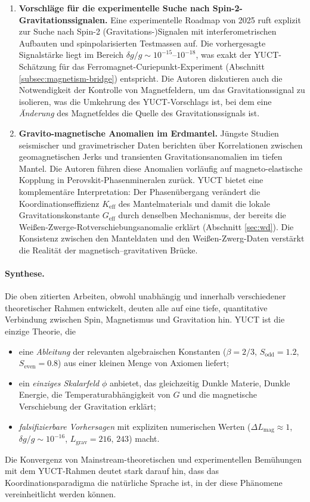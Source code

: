 \documentclass[12pt]{article}
\theoremstyle{remark}
\begin{document}
\begin{enumerate}
		\item \textbf{Vorschläge für die experimentelle Suche nach Spin-2-Gravitationssignalen.}
		Eine experimentelle Roadmap von 2025 \cite{Spin2Proposal2025} ruft explizit zur Suche
		nach Spin-2 (Gravitations-)Signalen mit interferometrischen Aufbauten und spinpolarisierten
		Testmassen auf.  Die vorhergesagte Signalstärke liegt im Bereich $\delta g / g \sim 10^{-15}$–$10^{-18}$,
		was exakt der YUCT-Schätzung für das Ferromagnet-Curiepunkt-Experiment (Abschnitt \ref{subsec:magnetism-bridge}) entspricht.
		Die Autoren diskutieren auch die Notwendigkeit der Kontrolle von Magnetfeldern, um das
		Gravitationssignal zu isolieren, was die Umkehrung des YUCT-Vorschlags ist, bei dem eine
		\emph{Änderung} des Magnetfeldes die Quelle des Gravitationssignals ist.
		
		\item \textbf{Gravito-magnetische Anomalien im Erdmantel.}
		Jüngste Studien seismischer und gravimetrischer Daten \cite{MantleGM2025} berichten über
		Korrelationen zwischen geomagnetischen Jerks und transienten Gravitationsanomalien im
		tiefen Mantel.  Die Autoren führen diese Anomalien vorläufig auf magneto-elastische Kopplung
		in Perovskit-Phasenmineralen zurück.  YUCT bietet eine komplementäre Interpretation:
		Der Phasenübergang verändert die Koordinationseffizienz $K_{\mathrm{eff}}$ des Mantelmaterials
		und damit die lokale Gravitationskonstante $G_{\mathrm{eff}}$ durch denselben Mechanismus,
		der bereits die Weißen-Zwerge-Rotverschiebungsanomalie erklärt (Abschnitt \ref{sec:wd}).
		Die Konsistenz zwischen den Manteldaten und den Weißen-Zwerg-Daten verstärkt die Realität
		der magnetisch–gravitativen Brücke.
		
	\end{enumerate}
	
	\paragraph{Synthese.}
	Die oben zitierten Arbeiten, obwohl unabhängig und innerhalb verschiedener theoretischer Rahmen
	entwickelt, deuten alle auf eine tiefe, quantitative Verbindung zwischen Spin, Magnetismus
	und Gravitation hin.  YUCT ist die einzige Theorie, die
	\begin{itemize}
		\item eine \emph{Ableitung} der relevanten algebraischen Konstanten
		($\beta = 2/3$, $S_{\mathrm{odd}} = 1.2$, $S_{\mathrm{even}} = 0.8$)
		aus einer kleinen Menge von Axiomen liefert;
		\item ein \emph{einziges Skalarfeld} $\phi$ anbietet, das gleichzeitig
		Dunkle Materie, Dunkle Energie, die Temperaturabhängigkeit von $G$ und
		die magnetische Verschiebung der Gravitation erklärt;
		\item \emph{falsifizierbare Vorhersagen} mit expliziten numerischen
		Werten ($\Delta L_{\mathrm{mag}} \approx 1$, $\delta g/g \sim 10^{-16}$,
		$L_{\mathrm{grav}} = 216,\,243$) macht.
	\end{itemize}
	Die Konvergenz von Mainstream-theoretischen und experimentellen Bemühungen mit
	dem YUCT-Rahmen deutet stark darauf hin, dass das Koordinationsparadigma die
	natürliche Sprache ist, in der diese Phänomene vereinheitlicht werden können.
	
\end{document}
